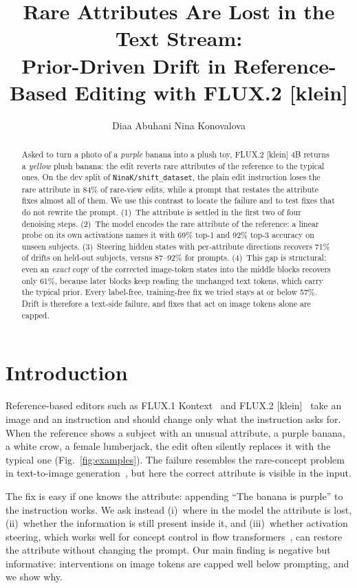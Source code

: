 \documentclass[10pt,twocolumn]{article}
\title{\vspace{-1.2em}Rare Attributes Are Lost in the Text Stream:\\Prior-Driven Drift in Reference-Based Editing with FLUX.2 [klein]}
\author{Diaa Abuhani \quad Nina Konovalova}
\date{}
\begin{document}
\maketitle

\begin{abstract}
Asked to turn a photo of a \emph{purple} banana into a plush toy, FLUX.2 [klein] 4B returns a \emph{yellow} plush banana: the
edit reverts rare attributes of the reference to the typical ones. On the dev split of \texttt{NinaK/shift\_dataset}, the plain edit
instruction loses the rare attribute in 84\% of rare-view edits, while a prompt that restates the attribute fixes almost all of them. We use this
contrast to locate the failure and to test fixes that do not rewrite the prompt. (1)~The attribute is settled in the first two
of four denoising steps. (2)~The model encodes the rare attribute of the reference: a linear probe on its own activations names
it with 69\% top-1 and 92\% top-3 accuracy on unseen subjects. (3)~Steering hidden states with per-attribute directions
recovers 71\% of drifts on held-out subjects, versus 87--92\% for prompts. (4)~This gap is structural: even an \emph{exact}
copy of the corrected image-token states into the middle blocks recovers only 61\%, because later blocks keep reading the
unchanged text tokens, which carry the typical prior. Every label-free, training-free fix we tried stays at or below 57\%.
Drift is therefore a text-side failure, and fixes that act on image tokens alone are capped.
\end{abstract}

\section{Introduction}
Reference-based editors such as FLUX.1 Kontext~\citep{kontext} and FLUX.2 [klein]~\citep{flux2} take an image and an instruction
and should change only what the instruction asks for. When the reference shows a subject with an unusual attribute, a purple
banana, a white crow, a female lumberjack, the edit often silently replaces it with the typical one
(Fig.~\ref{fig:examples}). The failure resembles the rare-concept problem in text-to-image generation~\citep{r2f}, but here the
correct attribute is visible in the input.

The fix is easy if one knows the attribute: appending ``The banana is purple'' to the instruction works. We ask instead
(i)~where in the model the attribute is lost, (ii)~whether the information is still present inside it, and (iii)~whether
activation steering, which works well for concept control in flow transformers~\citep{shift,actadd}, can restore the
attribute without changing the prompt. Our main finding is negative but informative: interventions on image tokens are capped
well below prompting, and we show why.
\end{document}
